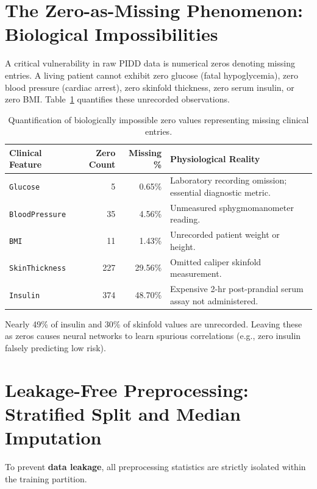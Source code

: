 \documentclass{report}
\begin{document}
\section{The Zero-as-Missing Phenomenon: Biological Impossibilities}

A critical vulnerability in raw PIDD data is numerical zeros denoting missing entries. A living patient cannot exhibit zero glucose (fatal hypoglycemia), zero blood pressure (cardiac arrest), zero skinfold thickness, zero serum insulin, or zero BMI. Table~\ref{tab:missing_zeros} quantifies these unrecorded observations.

\begin{table}[htbp]
\centering
\footnotesize
\renewcommand{\arraystretch}{0.80}
\begin{tabularx}{\textwidth}{l r r X}
\toprule
\textbf{Clinical Feature} & \textbf{Zero Count} & \textbf{Missing \%} & \textbf{Physiological Reality} \\
\midrule
\texttt{Glucose} & 5 & 0.65\% & Laboratory recording omission; essential diagnostic metric. \\
\texttt{BloodPressure} & 35 & 4.56\% & Unmeasured sphygmomanometer reading. \\
\texttt{BMI} & 11 & 1.43\% & Unrecorded patient weight or height. \\
\texttt{SkinThickness} & 227 & 29.56\% & Omitted caliper skinfold measurement. \\
\texttt{Insulin} & 374 & 48.70\% & Expensive 2-hr post-prandial serum assay not administered. \\
\bottomrule
\end{tabularx}
\caption[Quantification of Biologically Impossible Zero Values]{Quantification of biologically impossible zero values representing missing clinical entries.}
\label{tab:missing_zeros}
\end{table}

Nearly 49\% of insulin and 30\% of skinfold values are unrecorded. Leaving these as zeros causes neural networks to learn spurious correlations (e.g., zero insulin falsely predicting low risk).

\section{Leakage-Free Preprocessing: Stratified Split and Median Imputation}

To prevent \textbf{data leakage}, all preprocessing statistics are strictly isolated within the training partition.
\end{document}
